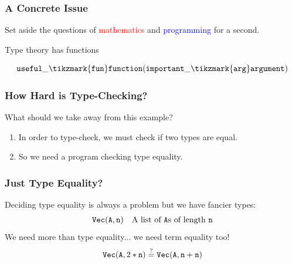 \documentclass[usenames,dvipsnames,aspectratio=169,12pt]{beamer}
\begin{document}
\begin{frame}
  \frametitle{A Concrete Issue}
  Set aside the questions of \textcolor{Red}{mathematics} and \textcolor{Blue}{programming} for a
  second.
  \bigskip

  Type theory has functions
  \begin{example}
    \[
      \App{\Lang{useful\_\tikzmark{fun}function}}{\Lang{important\_\tikzmark{arg}argument}}
    \]
  \end{example}
\end{frame}

\begin{frame}
  \frametitle{How Hard is Type-Checking?}
  What should we take away from this example?
  \begin{enumerate}
  \item In order to type-check, we must check if two types are equal.
  \item So we need a program checking type equality.
  \end{enumerate}
\end{frame}

\begin{frame}
  \frametitle{Just Type Equality?}
  Deciding type equality is always a problem but we have fancier types:
  \begin{align*}
    \mathtt{Vec}(\mathtt{A}, \mathtt{n}) &&
    \text{A list of $\mathtt{A}$s of length $\mathtt{n}$}
  \end{align*}
  \pause
  We need more than type equality... we need term equality too!
  \[
    \mathtt{Vec}(\mathtt{A}, 2 * \mathtt{n}) \stackrel{?}{=} \mathtt{Vec}(\mathtt{A}, \mathtt{n} + \mathtt{n})
  \]
\end{frame}
\end{document}
